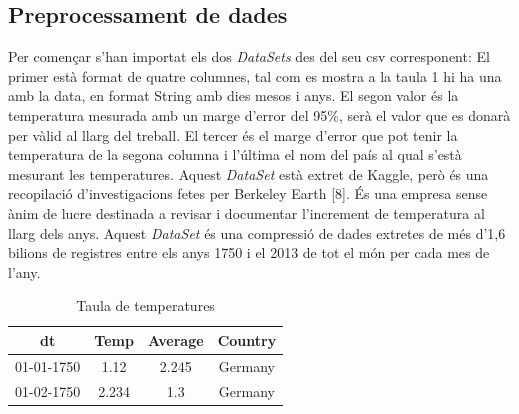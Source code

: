 \documentclass[10pt,a4paper,twocolumn,twoside]{article}
\begin{document}
\subsection{Preprocessament de dades}
Per començar s'han importat els dos \textit{DataSets} des del seu csv corresponent:
El primer està format de quatre columnes, tal com es mostra a la taula 1 hi ha una amb la data, en format String amb dies mesos i anys. El segon valor és la temperatura mesurada amb un marge d'error del 95\%, serà el valor que es donarà per vàlid al llarg del treball. El tercer és el marge d'error que pot tenir la temperatura de la segona columna i l'última el nom del país al qual s'està mesurant les temperatures. Aquest \textit{DataSet} està extret de Kaggle, però és una recopilació d'investigacions fetes per Berkeley Earth [8]. És una empresa sense ànim de lucre destinada a revisar i documentar l'increment de temperatura al llarg dels anys. Aquest \textit{DataSet} és una compressió de dades extretes de més d'1,6 bilions de registres entre els anys 1750 i el 2013 de tot el món per cada mes de l'any.
\begin{table}[ht]
\caption{Taula de temperatures}
\begin{center}
\begin{tabular}{c c c c} %
\hline\hline %
dt & Temp & Average & Country \\
\hline
01-01-1750 & 1.12 & 2.245 & Germany \\
01-02-1750 & 2.234 & 1.3 & Germany \\
\hline
\end{tabular}
\end{center}
\end{table}
\end{document}
